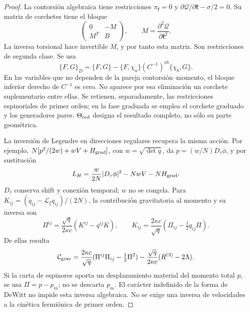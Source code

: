 \begin{proof}
La contorsión algebraica tiene restricciones
\(\pi_{\mathfrak k}=0\) y
\(\partial\mathcal Q/\partial\mathfrak k-\sigma/2=0\).
Su matriz de corchetes tiene el bloque
\[
 \begin{pmatrix}0&-M\\ M^T&B\end{pmatrix},
 \qquad M=\frac{\partial^2\mathcal Q}{\partial\mathfrak k^2}.
\]
La inversa torsional hace invertible \(M\), y por tanto esta matriz.
Son restricciones de segunda clase. Se usa
\begin{equation}
 \{F,G\}_D=\{F,G\}
       -\{F,\chi_a\}(C^{-1})^{ab}\{\chi_b,G\}.
 \label{hmtcuatro:corchete-dirac}
\end{equation}
En las variables que no dependen de la pareja contorsión--momento,
el bloque inferior derecho de \(C^{-1}\) es cero. No aparece por esa
eliminación un corchete suplementario entre ellas. Se retienen,
separadamente, las restricciones espinoriales de primer orden; en la
fase graduada se emplea el corchete graduado y los generadores pares.
\(\Theta_{\rm red}\) designa el resultado completo, no sólo su parte
geométrica.

La inversión de Legendre en direcciones regulares recupera la misma
acción. Por ejemplo, \(N[p^2/(2w)+wV+H_{\rm grad}]\), con
\(w=\sqrt{\det q}\), da \(p=(w/N)D_\tau\phi\), y por sustitución
\[
 L_H=\frac{w}{2N}|D_\tau\phi|^2-NwV-NH_{\rm grad}.
\]
\(D_\tau\) conserva shift y conexión temporal; \(w\) no se congela.
Para \(K_{ij}=(\dot q_{ij}-\mathcal L_\xi q_{ij})/(2N)\), la
contribución gravitatoria al momento y su inversa son
\begin{equation}
 \Pi^{ij}=\frac{\sqrt q}{2\kappa c}(K^{ij}-q^{ij}K),\qquad
 K_{ij}=\frac{2\kappa c}{\sqrt q}
                  (\Pi_{ij}-\tfrac12q_{ij}\Pi).
 \label{hmtcuatro:legendre-geometrica}
\end{equation}
De ellas resulta
\[
 \mathcal C_{\rm grav}
 =\frac{2\kappa c}{\sqrt q}
       (\Pi^{ij}\Pi_{ij}-\tfrac12\Pi^2)
  -\frac{\sqrt q}{2\kappa c}(R^{(3)}-2\Lambda).
\]
Si la carta de espinores aporta un desplazamiento material del momento
total \(p\), se usa \(\Pi=p-p_m\); no se descarta \(p_m\).
El carácter indefinido de la forma de DeWitt no impide esta inversa algebraica.
No se exige una inversa de velocidades a la cinética fermiónica de
primer orden.


\end{proof}
